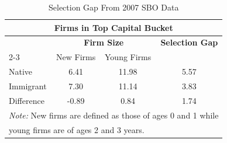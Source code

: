 \begin{table}
    \centering
\begin{tabular}{lccc}
\multicolumn{4}{c}{\large \textbf{Firms in Top Capital Bucket}} \\
\toprule \toprule
 & \multicolumn{2}{c}{\textbf{Firm Size}} & \textbf{Selection Gap} \\
\cmidrule(lr){2-3}  & New Firms & Young Firms &  \\
\midrule 
Native & 6.41 & 11.98 & 5.57 \\
Immigrant & 7.30 & 11.14 & 3.83 \\
\midrule
Difference & -0.89 & 0.84 & 1.74 \\
\bottomrule \bottomrule
\multicolumn{4}{l}{\small\textit{Note:} New firms are defined as those of ages 0 and 1 while} \\
\multicolumn{4}{l}{\small young firms are of ages 2 and 3 years.} 
\end{tabular}
 \caption{Selection Gap From 2007 SBO Data}
    \label{tab:selection_gap}\end{table}
